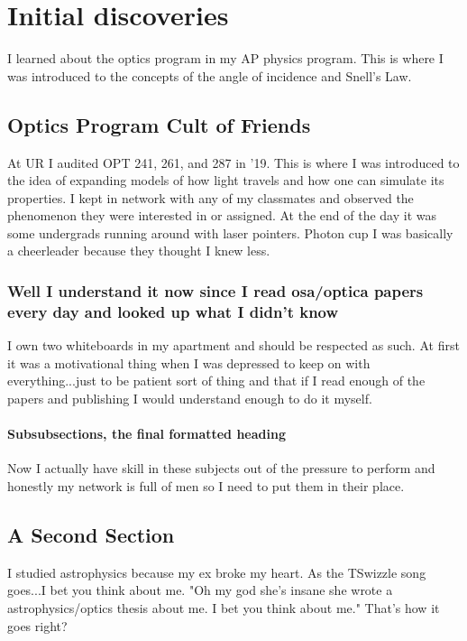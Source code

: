 \chapter{Initial discoveries}

I learned about the optics program in my AP physics program. This is where I was introduced to the concepts of the angle of incidence and Snell's Law. 

\section[Shorter Title]{Optics Program Cult of Friends}

At UR I audited OPT 241, 261, and 287 in '19. This is where I was introduced to the idea of expanding models of how light travels and how one can simulate its properties. I kept in network with any of my classmates and observed the phenomenon they were interested in or assigned. At the end of the day it was some undergrads running around with laser pointers. Photon cup I was basically a cheerleader because they thought I knew less.  

\subsection{Well I understand it now since I read osa/optica papers every day and looked up what I didn't know}

I own two whiteboards in my apartment and should be respected as such. At first it was a motivational thing when I was depressed to keep on with everything...just to be patient sort of thing and that if I read enough of the papers and publishing I would understand enough to do it myself. 

\subsubsection{Subsubsections, the final formatted heading}

Now I actually have skill in these subjects out of the pressure to perform and honestly my network is full of men so I need to put them in their place. 

\section{A Second Section}

I studied astrophysics because my ex broke my heart. As the TSwizzle song goes...I bet you think about me. "Oh my god she's insane she wrote a astrophysics/optics thesis about me. I bet you think about me." That's how it goes right?